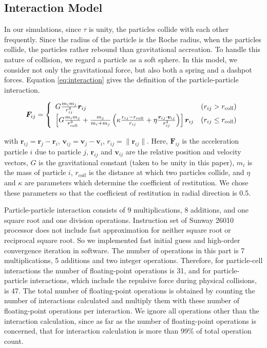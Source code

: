 \documentclass[oribibl]{llncs}
\begin{document}
\subsection{Interaction Model}

In our simulations, since $\tau$ is unity, the particles collide with
each other frequently. Since the radius of the particle is the Roche
radius, when the particles collide, the particles rather rebound than
gravitational accreation. To handle this nature of collision, we
regard a particle as a soft sphere. In this model, we consider not
only the gravitational force, but also both a spring and a dashpot
forces. Equation \ref{eq:interaction} gives the definition of the
particle-particle interaction.

\begin{eqnarray}
  \bm F_{ij} = \left \{
  \begin{array}{ll}
     G \frac{m_i m_j}{r_{ij}^3} \bm r_{ij} & \left(r_{ij} > r_{\rm coll} \right) \\
     \left[  G \frac{m_i m_j} {r_{\rm coll}^3} + \frac{m_j}{m_i + m_j} \left( \kappa \frac{ r_{ij} - r_{\rm coll}}{r_{ij}} + \eta \frac{\bm r_{ij} \cdot \bm v_{ij}}{r_{ij}^2} \right) \right] \bm r_{ij} & \left( r_{ij} \le r_{\rm coll} \right)
  \end{array}
  \right.
  \label{eq:interaction} 
\end{eqnarray}

with $\bm r_{ij} = \bm r_j - \bm r_i$, $\bm v_{ij} = \bm v_j - \bm
v_i$, $r_{ij} = \| \bm r_{ij} \|$. Here, ${\mathbf F_{ij}}$ is the
acceleration particle $i$ due to particle $j$, ${\mathbf r_{ij}}$ and
${\mathbf v_{ij}}$ are the relative position and velocity vectors, $G$
is the gravitational constant (taken to be unity in this paper), $m_i$
is the mass of particle $i$, $r_{coll}$ is the distance at which two
particles collide, and $\eta$ and $\kappa$ are parameters which
determine the coefficient of restitution. We chose these parameters so
that the coefficient of restitution in radial direction is 0.5.

Particle-particle interaction consists of 9 multiplications, 8
additions, and one square root and one division
operations. Instruction set of Sunway 26010 processor does not include
fast approximation for neither square root or reciprocal square
root. So we implemented fast initial guess and high-order convergence
iteration in software. The number of operations in this part is 7
multiplications, 5 additions and two integer operations. Therefore,
for particle-cell interactions the number of floating-point operations
is 31, and for particle-particle interactions, which include the
repulsive force during physical collisions, is 47. The total number of
floating-point operations is obtained by counting the number of
interactions calculated and multiply them with these number of
floating-point operations per interaction. We ignore all operations
other than the interaction calculation, since as far as the number of
floating-point operations is concerned, that for interaction
calculation is more than 99\% of total operation count.
\end{document}
